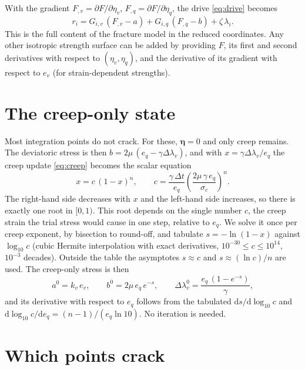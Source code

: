 \documentclass[11pt,a4paper]{article}
\newcommand{\bfeta}{\bm{\eta}}
\begin{document}
With the gradient $F_{,v}=\partial F/\partial\eta_v$, $F_{,q}=\partial F/\partial\eta_q$, the
drive \eqref{eq:drive} becomes
\begin{equation}
  r_i=G_{i,v}\,(F_{,v}-a)+G_{i,q}\,(F_{,q}-b)+\zeta\,\lambda_i .
  \label{eq:drive_reduced}
\end{equation}
This is the full content of the fracture model in the reduced coordinates. Any other isotropic
strength surface can be added by providing $F$, its first and second derivatives with respect to
$(\eta_v,\eta_q)$, and the derivative of its gradient with respect to $e_v$ (for
strain-dependent strengths).

\section{The creep-only state}

Most integration points do not crack. For these, $\bfeta=0$ and only creep remains. The
deviatoric stress is then $b=2\mu\,(e_q-\gamma\Delta\lambda_v)$, and with
$x=\gamma\Delta\lambda_v/e_q$ the creep update \eqref{eq:creep} becomes the scalar equation
\begin{equation}
  x=c\,(1-x)^n,\qquad
  c=\frac{\gamma\,\Delta t}{e_q}\left(\frac{2\mu\,\gamma\,e_q}{\sigma_c}\right)^n .
  \label{eq:creep_only}
\end{equation}
The right-hand side decreases with $x$ and the left-hand side increases, so there is exactly one
root in $[0,1)$. This root depends on the single number $c$, the creep strain the trial stress
would cause in one step, relative to $e_q$. We solve it once per creep exponent, by bisection to
round-off, and tabulate $s=-\ln(1-x)$ against $\log_{10}c$ (cubic Hermite interpolation with
exact derivatives, $10^{-30}\leq c\leq10^{14}$, $10^{-3}$ decades). Outside the table the
asymptotes $s\approx c$ and $s\approx(\ln c)/n$ are used. The creep-only stress is then
\begin{equation}
  a^0=k_v\,e_v,\qquad b^0=2\mu\,e_q\,e^{-s},\qquad \Delta\lambda_v^0=\frac{e_q\,(1-e^{-s})}{\gamma},
\end{equation}
and its derivative with respect to $e_q$ follows from the tabulated $\mathrm{d}s/\mathrm{d}\log_{10}c$
and $\mathrm{d}\log_{10}c/\mathrm{d}e_q=(n-1)/(e_q\ln10)$. No iteration is needed.

\section{Which points crack}
\end{document}

